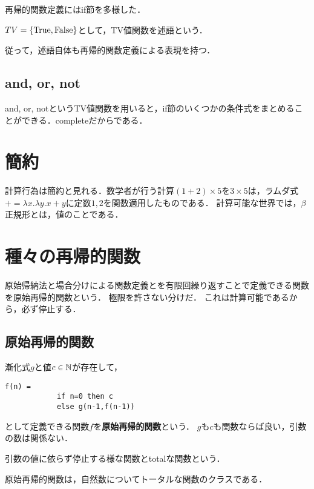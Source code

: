 \documentclass[uplatex, 12pt, dvipdfmx]{jsreport}
\begin{document}
再帰的関数定義にはif節を多様した．
\begin{definition}[predicate]
    $TV=\{\mathrm{True},\mathrm{False}\}$として，TV値関数を述語という．
\end{definition}
従って，述語自体も再帰的関数定義による表現を持つ．

\subsection{and, or, not}

and, or, notというTV値関数を用いると，if節のいくつかの条件式をまとめることができる．completeだからである．

\section{簡約}

計算行為は簡約と見れる．数学者が行う計算$(1+2)\times 5$を$3\times 5$は，ラムダ式$+=\lambda x.\lambda y.x+y$に定数$1,2$を関数適用したものである．
計算可能な世界では，$\beta$正規形とは，値のことである．

\section{種々の再帰的関数}

原始帰納法と場合分けによる関数定義とを有限回繰り返すことで定義できる関数を原始再帰的関数という．
極限を許さない分けだ．
これは計算可能であるから，必ず停止する．

\subsection{原始再帰的関数}

\begin{definition}
    漸化式$g$と値$c\in\mathbb{N}$が存在して，
    \begin{lstlisting}[caption=primitive recursive function]
        f(n) = 
            if n=0 then c
            else g(n-1,f(n-1))
    \end{lstlisting}
    として定義できる関数$f$を\textbf{原始再帰的関数}という．
    $g$も$c$も関数ならば良い，引数の数は関係ない．
\end{definition}

\begin{definition}[total]
    引数の値に依らず停止する様な関数とtotalな関数という．
\end{definition}
\begin{remark}
    原始再帰的関数は，自然数についてトータルな関数のクラスである．
\end{remark}
\end{document}

